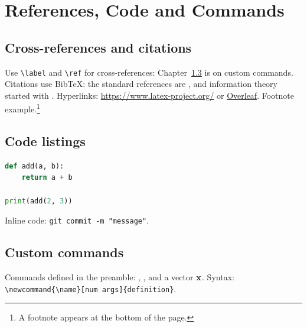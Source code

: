 \chapter{References, Code and Commands}

\section{Cross-references and citations}
Use \verb|\label| and \verb|\ref| for cross-references:
Chapter~\ref{ch:custom} is on custom commands.
Citations use BibTeX: the standard references are \cite{lamport1994,knuth1984},
and information theory started with \cite{shannon1948}.
Hyperlinks: \url{https://www.latex-project.org/} or
\href{https://www.overleaf.com}{Overleaf}.
Footnote example.\footnote{A footnote appears at the bottom of the page.}

\section{Code listings}
\begin{lstlisting}[language=Python, caption={A Python listing}]
def add(a, b):
    return a + b

print(add(2, 3))
\end{lstlisting}

Inline code: \lstinline|git commit -m "message"|.

\section{Custom commands}
\label{ch:custom}
Commands defined in the preamble: , , and a vector $\mathbf{x}$.
Syntax: \verb|\newcommand{\name}[num args]{definition}|.

